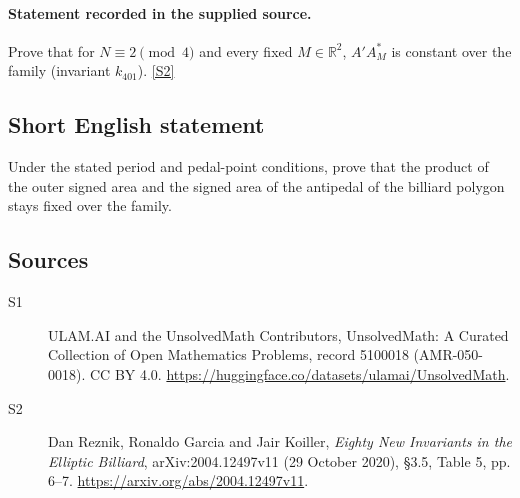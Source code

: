 \documentclass[11pt]{article}
\newcommand{\sref}[2]{\hyperlink{source:#1:#2}{[S#2]}}
\begin{document}
\paragraph{Statement recorded in the supplied source.}
Prove that for $N\equiv2\pmod4$ and every fixed $M\in\mathbb R^2$, $A'A_M^*$ is constant over the family (invariant $k_{401}$). \sref{5100018}{2}
\subsection{Short English statement}
Under the stated period and pedal-point conditions, prove that the product of the outer signed area and the signed area of the antipedal of the billiard polygon stays fixed over the family.
\subsection{Sources}
\begin{description}
\item[\hypertarget{source:5100018:1}{S1}] ULAM.AI and the UnsolvedMath Contributors, UnsolvedMath: A Curated Collection of Open Mathematics Problems, record 5100018 (AMR-050-0018). CC BY 4.0. \url{https://huggingface.co/datasets/ulamai/UnsolvedMath}.
\item[\hypertarget{source:5100018:2}{S2}] Dan Reznik, Ronaldo Garcia and Jair Koiller, \emph{Eighty New Invariants in the Elliptic Billiard}, arXiv:2004.12497v11 (29 October 2020), \S3.5, Table 5, pp. 6--7. \url{https://arxiv.org/abs/2004.12497v11}.
\end{description}
\label{end:5100018}
\end{document}
